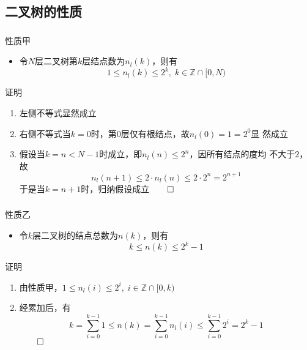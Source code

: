 \subsection{二叉树的性质}

\begin{frame}
    \frametitle{\insertsubsectionhead}
    \begin{block}{性质甲}
        \begin{itemize}
            \item 令$N$层二叉树第$k$层结点数为$n_{l}(k)$，则有
            \[
                1\leq{}n_{l}(k)\leq2^{k},\;k\in\mathbb{Z}\cap[0,N)
            \]
        \end{itemize}
    \end{block}
    \pause
    \begin{exampleblock}{证明}
        \begin{enumerate}
            \item 左侧不等式显然成立
            \item 右侧不等式当$k=0$时，第$0$层仅有根结点，故$n_{l}(0)=1=2^{0}$显
                  然成立
            \item 假设当$k=n<N-1$时成立，即$n_{l}(n)\leq2^{n}$，因所有结点的度均
                  不大于$2$，故
                  \[
                        n_{l}(n+1)\leq2\cdot{}n_{l}(n)\leq2\cdot2^{n}=2^{n+1}
                  \]
                  于是当$k=n+1$时，归纳假设成立\hfill$\qed$
        \end{enumerate}
    \end{exampleblock}
\end{frame}

\begin{frame}
    \frametitle{\insertsubsectionhead}
    \begin{block}{性质乙}
        \begin{itemize}
            \item 令$k$层二叉树的结点总数为$n(k)$，则有
                  \[
                        k\leq{}n(k)\leq2^{k}-1
                  \]
        \end{itemize}
    \end{block}
    \pause
    \begin{exampleblock}{证明}
        \begin{enumerate}
            \item 由性质甲，$1\leq{}n_{l}(i)\leq2^{i},\;i\in\mathbb{Z}\cap[0,k)$
            \item 经累加后，有
                  \[
                        k=\sum_{i=0}^{k-1}{1}\leq{}n(k)=\sum_{i=0}^{k-1}{n_{l}(i)}\leq\sum_{i=0}^{k-1}{2^{i}}=2^{k}-1
                  \]
                  \hfill$\qed$
        \end{enumerate}
    \end{exampleblock}
\end{frame}

